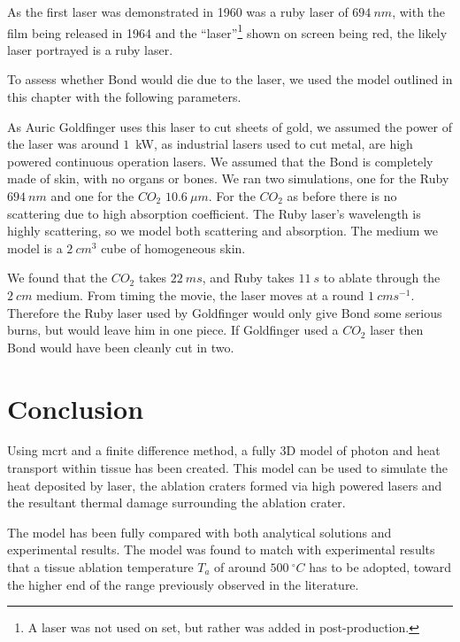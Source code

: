 As the first laser was demonstrated in 1960 was a ruby laser of $694~nm$, with the film being released in 1964 and the ``laser''\footnote{A laser was not used on set, but rather was added in post-production.} shown on screen being red, the likely laser portrayed is a ruby laser.

To assess whether Bond would die due to the laser, we used the model outlined in this chapter with the following parameters.

As Auric Goldfinger uses this laser to cut sheets of gold, we assumed the power of the laser was around $1$~kW, as industrial lasers used to cut metal, are high powered continuous operation lasers.
We assumed that the Bond is completely made of skin, with no organs or bones.
We ran two simulations, one for the Ruby $694~nm$ and one for the $CO_2$ $10.6~\mu m$.
For the $CO_2$ as before there is no scattering due to high absorption coefficient. The Ruby laser's wavelength is highly scattering, so we model both scattering and absorption.
The medium we model is a $2~cm^3$ cube of homogeneous skin.

We found that the $CO_2$ takes $22~ms$, and Ruby takes $11~s$ to ablate through the $2~cm$ medium.
From timing the movie, the laser moves at a round $1~cms^{-1}$.
Therefore the Ruby laser used by Goldfinger would only give Bond some serious burns, but would leave him in one piece.
If Goldfinger used a $CO_2$ laser then Bond would have been cleanly cut in two.



\section{Conclusion}

Using \gls*{mcrt} and a finite difference method, a fully 3D model of photon and heat transport within tissue has been created. This model can be used to simulate the heat deposited by laser, the ablation craters formed via high powered lasers and the resultant thermal damage surrounding the ablation crater.

The model has been fully compared with both analytical solutions and experimental results. 
The model was found to match with experimental results that a tissue ablation temperature $T_a$ of around $500~^{\circ}C$ has to be adopted, toward the higher end of the range previously observed in the literature.

